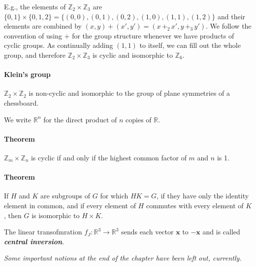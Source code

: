 \documentclass[a4paper,twocolumn,10pt]{article}
\begin{document}
  E.g., the elements of $\mathbb{Z}_2 \times \mathbb{Z}_3$ are
  $\{0,1\}\times\{0,1,2\} = \{(0,0), (0,1), (0,2), (1,0), (1,1), (1,2)\}$ and
  their elements are combined by $(x,y) + (x',y') = (x \,+_2\, x', y \,+_3\, y')$.
  We follow the convention of using $+$ for the group structure whenever we
  have products of cyclic groups. As continually adding $(1,1)$ to itself, we
  can fill out the whole group, and therefore $\mathbb{Z}_2 \times
  \mathbb{Z}_3$ is cyclic and isomorphic to $\mathbb{Z}_6$.

  \paragraph{Klein's group} $\mathbb{Z}_2 \times \mathbb{Z}_2$ is non-cyclic
  and isomorphic to the group of plane symmetries of a chessboard.

  We write $\mathbb{R}^n$ for the direct product of $n$ copies of $\mathbb{R}$.

  \paragraph{Theorem } $\mathbb{Z}_m \times \mathbb{Z}_n$ is
  cyclic if and only if the highest common factor of $m$ and $n$ is 1.

  \paragraph{Theorem } If $H$ and $K$ are subgroups of $G$ for
  which $HK=G$, if they have only the identity element in common, and if every
  element of $H$ commutes with every element of $K$, then $G$ is isomorphic to
  $H \times K$.

  The linear transofmration $f_J\colon \mathbb{R}^3 \rightarrow \mathbb{R}^3$
  sends each vector $\bm{x}$ to $\bm{-x}$ and is called
  \textbf{\textit{central inversion}}.

  \textit{Some important notions at the end of the chapter have been left out,
  currently.}
\end{document}

